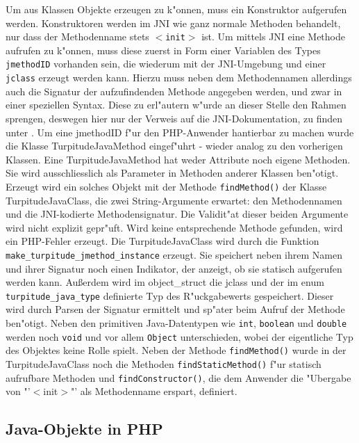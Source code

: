 Um aus Klassen Objekte erzeugen zu k"onnen, muss ein Konstruktor aufgerufen werden. Konstruktoren werden im JNI wie ganz normale Methoden
behandelt, nur dass der Methodenname stets \texttt{$<$init$>$} ist. Um mittels JNI eine Methode aufrufen zu k"onnen, muss diese zuerst in
Form einer Variablen des Types \texttt{jmethodID} vorhanden sein, die wiederum mit der JNI-Umgebung und einer \texttt{jclass} erzeugt werden kann.
Hierzu muss neben dem Methodennamen allerdings auch die Signatur der aufzufindenden Methode angegeben werden, und zwar in einer speziellen
Syntax. Diese zu erl"autern w"urde an dieser Stelle den Rahmen sprengen, deswegen hier nur der Verweis auf die JNI-Dokumentation, zu finden
unter \cite{JNIHP}.
Um eine jmethodID f"ur den PHP-Anwender hantierbar zu machen wurde die Klasse TurpitudeJavaMethod eingef"uhrt - wieder analog zu den
vorherigen Klassen. Eine TurpitudeJavaMethod hat weder Attribute noch eigene Methoden. Sie wird ausschliesslich als Parameter in Methoden
anderer Klassen ben"otigt. Erzeugt wird ein solches Objekt mit der Methode \texttt{findMethod()} der Klasse TurpitudeJavaClass, die zwei 
String-Argumente erwartet: den Methodennamen und die JNI-kodierte Methodensignatur. Die Validit"at dieser beiden Argumente wird nicht explizit
gepr"uft. Wird keine entsprechende Methode gefunden, wird ein PHP-Fehler erzeugt. Die TurpitudeJavaClass wird durch die Funktion
\texttt{make\_turpitude\_jmethod\_instance} erzeugt. Sie speichert neben ihrem Namen und ihrer Signatur noch einen Indikator, der anzeigt,
ob sie statisch aufgerufen werden kann. Au\ss erdem wird im object\_struct die jclass und der im enum \texttt{turpitude\_java\_type} definierte
Typ des R"uckgabewerts gespeichert. Dieser wird durch Parsen der Signatur ermittelt und sp"ater beim Aufruf der Methode ben"otigt.
Neben den primitiven Java-Datentypen wie \texttt{int}, \texttt{boolean} und \texttt{double} werden noch \texttt{void} und vor allem \texttt{Object} unterschieden,
wobei der eigentliche Typ des Objektes keine Rolle spielt.
Neben der Methode \texttt{findMethod()} wurde in der TurpitudeJavaClass noch die Methoden \texttt{findStaticMethod()} f"ur statisch
aufrufbare Methoden und \texttt{findConstructor()}, die dem Anwender die "Ubergabe von "'$<$init$>$"' als Methodenname erspart, definiert.

\subsection{Java-Objekte in PHP}
\label{sec:chap1:impl:5}

